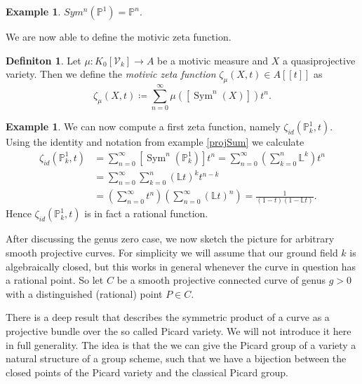 \documentclass[11pt, a4paper, german]{article}
\theoremstyle{plain}
\theoremstyle{definition}
\newtheorem{definition}[theorem]{Definiton}
\newtheorem{example}[theorem]{Example}
\newcommand{\gring}[1][k]{K_0[\mathcal{V}_#1]}
\DeclareMathOperator{\Sym}{Sym}
\begin{document}
\begin{example}
    $Sym^n(\mathbb{P}^1) = \mathbb{P}^n$. 
\end{example}

We are now able to define the motivic zeta function.

\begin{definition}
    Let $\mu \colon \gring \to A$ be a motivic measure and $X$ a quasiprojective variety. Then we define the \emph{motivic zeta function} 
    $\zeta_{\mu}(X,t) \in A[[t]]$ as
    \[
        \zeta_{\mu}(X,t) \coloneqq \sum_{n=0}^\infty \mu([\Sym^n(X)])t^n.
    \]
\end{definition}

\begin{example}
    We can now compute a first zeta function, namely $\zeta_{id}(\mathbb{P}_k^1, t)$. Using the identity and notation from example \ref{projSum}
    we calculate
    \begin{align*}
        \zeta_{id}(\mathbb{P}_k^1, t) & = \sum_{n=0}^\infty \left[\Sym^n({\mathbb{P}_k^1})\right]t^n 
                                       = \sum_{n=0}^\infty \left(\sum_{k=0}^n \mathbb{L}^k\right) t^n \\
                                       & = \sum_{n=0}^\infty \sum_{k=0}^n \left(\mathbb{L}t\right)^k t^{n-k} \\
                                      & = \left( \sum_{n=0}^\infty t^n \right) \left( \sum_{n=0}^\infty (\mathbb{L}t)^n \right) 
                                        = \frac{1}{(1-t)(1-\mathbb{L}t)} .
    \end{align*}
    Hence $\zeta_{id}(\mathbb{P}_k^1, t)$ is in fact a rational function.
\end{example}


After discussing the genus zero case, we now sketch the picture for arbitrary smooth projective curves. 
For simplicity we will assume that our ground field $k$ is algebraically closed, but
this works in general whenever the curve in question has a rational point. 
So let $C$ be a smooth projective connected curve of genus $g > 0$ with a distinguished (rational) point $P \in C$.

There is a deep result that describes the symmetric product of a curve as a projective bundle over the so called Picard variety. We will
not introduce it here in full generality. The idea is that the we can give the Picard group of a variety a natural structure of a group scheme,
such that we have a bijection between the closed points of the Picard variety and the classical
Picard group. 
\end{document}
